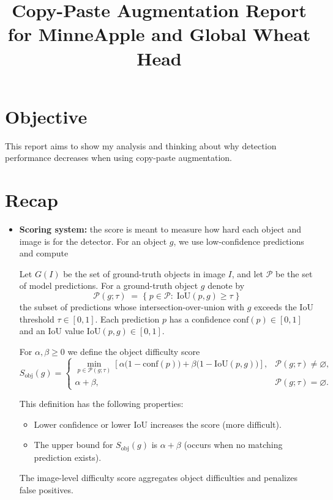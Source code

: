 \documentclass[11pt, a4paper]{article}
\title{\textbf{Copy-Paste Augmentation Report for MinneApple and Global Wheat Head}}
\author{}
\begin{document}
\maketitle

\section{Objective}
This report aims to show my analysis and thinking about why detection performance decreases when using copy-paste augmentation.

\section{Recap}
\begin{itemize}
\item \textbf{Scoring system:} the score is meant to measure how hard each object and image is for the detector. For an object $g$, we use low-confidence predictions and compute

Let $G(I)$ be the set of ground-truth objects in image $I$, and let $\mathcal{P}$ be the set of model predictions. For a ground-truth object $g$ denote by
\[\mathcal{P}(g;\tau)\;=\;\{\;p\in\mathcal{P}:\;\mathrm{IoU}(p,g)\ge\tau\;\}\]
the subset of predictions whose intersection-over-union with $g$ exceeds the IoU threshold $\tau\in[0,1]$. Each prediction $p$ has a confidence $\mathrm{conf}(p)\in[0,1]$ and an IoU value $\mathrm{IoU}(p,g)\in[0,1]$.

For $\alpha,\beta\ge0$ we define the object difficulty score
\[
S_{\mathrm{obj}}(g)
=
\begin{cases}
\displaystyle\min_{p\in\mathcal{P}(g;\tau)}\left[\alpha\bigl(1-\mathrm{conf}(p)\bigr)+\beta\bigl(1-\mathrm{IoU}(p,g)\bigr)\right], & \mathcal{P}(g;\tau)\neq\varnothing, \\
\alpha+\beta, & \mathcal{P}(g;\tau)=\varnothing.
\end{cases}
\]

This definition has the following properties:
\begin{itemize}
\item Lower confidence or lower IoU increases the score (more difficult). 
\item The upper bound for $S_{\mathrm{obj}}(g)$ is $\alpha+\beta$ (occurs when no matching prediction exists). 
\end{itemize}

The image-level difficulty score aggregates object difficulties and penalizes false positives. 


\end{itemize}
\end{document}
